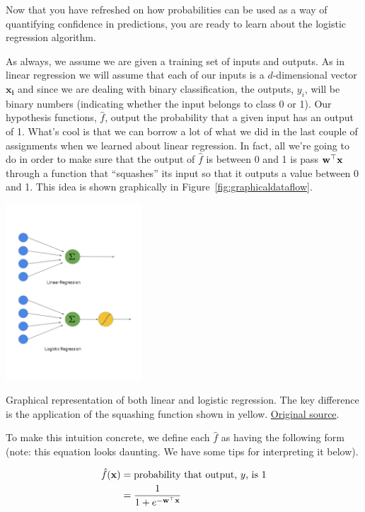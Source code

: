 \documentclass[assignment04_Solutions]{subfiles}
\begin{document}
Now that you have refreshed on how probabilities can be used as a way of quantifying confidence in predictions, you are ready to learn about the logistic regression algorithm.

As always, we assume we are given a training set of inputs and outputs.  As in linear regression we will assume that each of our inputs is a $d$-dimensional vector $\mathbf{x_i}$ and since we are dealing with binary classification, the outputs, $y_i$, will be binary numbers (indicating whether the input belongs to class 0 or 1).  Our hypothesis functions, $\hat{f}$, output the probability that a given input has an output of 1.  What's cool is that we can borrow a lot of what we did in the last couple of assignments when we learned about linear regression.  In fact, all we're going to do in order to make sure that the output of $\hat{f}$ is between 0 and 1 is pass $\mathbf{w}^\top \mathbf{x}$ through a function that ``squashes'' its input so that it outputs a value between 0 and 1.  This idea is shown graphically in Figure~\ref{fig:graphicaldataflow}.

\begin{marginfigure}
\includegraphics[width=2in]{figures/linearandlogistic}
\caption{Graphical representation of both linear and logistic regression.  The key difference is the application of the squashing function shown in yellow.  \href{https://towardsdatascience.com/building-a-logistic-regression-in-python-301d27367c24}{Original source}.}\label{fig:graphicaldataflow}
\end{marginfigure}
To make this intuition concrete, we define each $\hat{f}$ as having the following form (note: this equation looks daunting. We have some tips for interpreting it below).

\begin{align}
\hat{f}(\mathbf{x}) &= \mbox{probability that output, $y$, is 1} \nonumber \\
&=\frac{1}{1 + e^{-\mathbf{w}^\top \mathbf{x}}} \label{eq:logistichypothesis}
\end{align}
\end{document}
